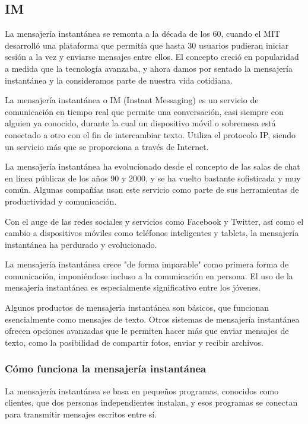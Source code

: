 \subsection{IM}

La mensajería instantánea se remonta a la década de los 60, cuando el MIT desarrolló una plataforma que permitía que hasta 30 usuarios pudieran iniciar sesión a la vez y enviarse mensajes entre ellos. El concepto creció en popularidad a medida que la tecnología avanzaba, y ahora damos por sentado la mensajería instantánea y la consideramos parte de nuestra vida cotidiana.

La mensajería instantánea o IM (Instant Messaging) es un servicio de comunicación en tiempo real que permite una conversación, casi siempre con alguien ya conocido, durante la cual un dispositivo móvil o sobremesa está conectado a otro con el fin de intercambiar texto. Utiliza el protocolo IP, siendo un servicio más que se proporciona a través de Internet.

La mensajería instantánea ha evolucionado desde el concepto de las salas de chat en línea públicas de los años 90 y 2000, y se ha vuelto bastante sofisticada y muy común. Algunas compañías usan este servicio como parte de sus herramientas de productividad y comunicación.

Con el auge de las redes sociales y servicios como Facebook y Twitter, así como el cambio a dispositivos móviles como teléfonos inteligentes y tablets, la mensajería instantánea ha perdurado y evolucionado.

La mensajería instantánea crece "de forma imparable" como primera forma de comunicación, imponiéndose incluso a la comunicación en persona. El uso de la mensajería instantánea es especialmente significativo entre los jóvenes.

Algunos productos de mensajería instantánea son básicos, que funcionan esencialmente como mensajes de texto. Otros sistemas de mensajería instantánea ofrecen opciones avanzadas que le permiten hacer más que enviar mensajes de texto, como la posibilidad de compartir fotos, enviar y recibir archivos.

\subsubsection{Cómo funciona la mensajería instantánea}

La mensajería instantánea se basa en pequeños programas, conocidos como clientes, que dos personas independientes instalan, y esos programas se conectan para transmitir mensajes escritos entre sí.

